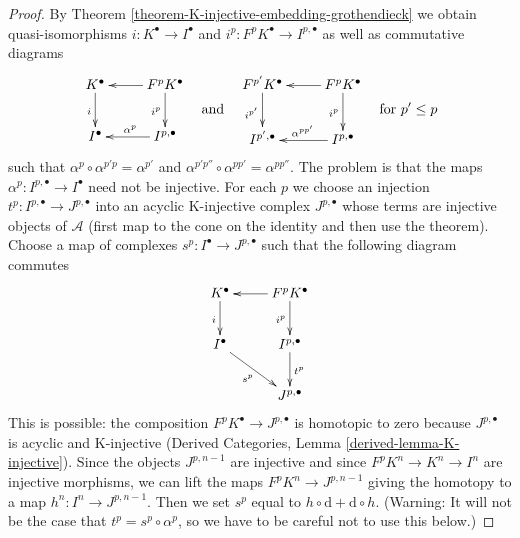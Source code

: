 \begin{proof}
By Theorem \ref{theorem-K-injective-embedding-grothendieck}
we obtain quasi-isomorphisms $i : K^\bullet \to I^\bullet$ and
$i^p : F^pK^\bullet \to I^{p, \bullet}$ as well as commutative diagrams
$$
\vcenter{
\xymatrix{
K^\bullet \ar[d]_i & F^pK^\bullet \ar[l] \ar[d]_{i^p} \\
I^\bullet & I^{p, \bullet} \ar[l]_{\alpha^p}
}
}
\quad\text{and}\quad
\vcenter{
\xymatrix{
F^{p'}K^\bullet \ar[d]_{i^{p'}} &
F^pK^\bullet \ar[l] \ar[d]_{i^p} \\
I^{p', \bullet} &
I^{p, \bullet} \ar[l]_{\alpha^{p p'}}
}
}
\quad\text{for }p' \leq p
$$
such that $\alpha^p \circ \alpha^{p' p} = \alpha^{p'}$
and $\alpha^{p'p''} \circ \alpha^{pp'} = \alpha^{pp''}$.
The problem is that the maps $\alpha^p : I^{p, \bullet} \to I^\bullet$
need not be injective. For each $p$ we choose an injection
$t^p : I^{p, \bullet} \to J^{p, \bullet}$ into an acyclic K-injective
complex $J^{p, \bullet}$ whose terms are injective objects of $\mathcal{A}$
(first map to the cone on the identity and then use the theorem).
Choose a map of complexes $s^p : I^\bullet \to J^{p, \bullet}$
such that the following diagram commutes
$$
\xymatrix{
K^\bullet \ar[d]_i & F^pK^\bullet \ar[l] \ar[d]_{i^p} \\
I^\bullet \ar[rd]_{s^p} & I^{p, \bullet} \ar[d]^{t^p} \\
& J^{p, \bullet}
}
$$
This is possible: the composition $F^pK^\bullet \to J^{p, \bullet}$
is homotopic to zero because $J^{p, \bullet}$ is acyclic and K-injective
(Derived Categories, Lemma \ref{derived-lemma-K-injective}).
Since the objects $J^{p, n - 1}$ are injective and since
$F^pK^n \to K^n \to I^n$ are injective morphisms, we
can lift the maps $F^pK^n \to J^{p, n - 1}$ giving the homotopy
to a map $h^n : I^n \to J^{p, n - 1}$. Then we set $s^p$
equal to $h \circ \text{d} + \text{d} \circ h$.
(Warning: It will not be the case that $t^p = s^p \circ \alpha^p$,
so we have to be careful not to use this below.)


\end{proof}
